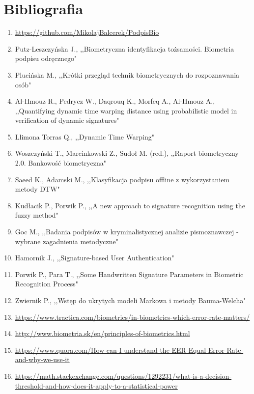 \documentclass[notitlepage, oneside]{report}
\begin{document}
\chapter*{Bibliografia}
\begin{enumerate}
    \item \url{https://github.com/MikolajBalcerek/PodpisBio}
     \item Putz-Leszczyńska J., ,,Biometryczna identyfikacja tożsamości. Biometria podpisu odręcznego"
     \item Plucińska M., ,,Krótki przegląd technik biometrycznych do rozpoznawania osób"
     \item Al-Hmouz R., Pedrycz W., Daqrouq K., Morfeq A., Al-Hmouz A.,  ,,Quantifying dynamic time warping distance using probabilistic model in veriﬁcation of dynamic signatures"
     \item Llimona Torras Q., ,,Dynamic Time Warping"
     \item Woszczyński T., Marcinkowski Z., Sudoł M. (red.), ,,Raport biometryczny 2.0. Bankowość biometryczna"
    \item Saeed K., Adamski M., ,,Klasyfikacja podpisu offline z wykorzystaniem metody DTW"
    \item Kudłacik P., Porwik P., ,,A new approach to signature recognition using the fuzzy method"
    \item Goc M., ,,Badania podpisów w kryminalistycznej analizie pismoznawczej - wybrane zagadnienia metodyczne"
    \item Hamornik J., ,,Signature-based User Authentication"
    \item Porwik P., Para T., ,,Some Handwritten Signature Parameters in Biometric Recognition Process"
    \item Zwiernik P., ,,Wstęp do ukrytych modeli Markowa i metody Bauma-Welcha"
    \item \url{https://www.tractica.com/biometrics/in-biometrics-which-error-rate-matters/}
    \item \url{http://www.biometria.sk/en/principles-of-biometrics.html}
    \item \url{https://www.quora.com/How-can-I-understand-the-EER-Equal-Error-Rate-and-why-we-use-it}
    \item \url{https://math.stackexchange.com/questions/1292231/what-is-a-decision-threshold-and-how-does-it-apply-to-a-statistical-power}

\end{enumerate}
\end{document}

